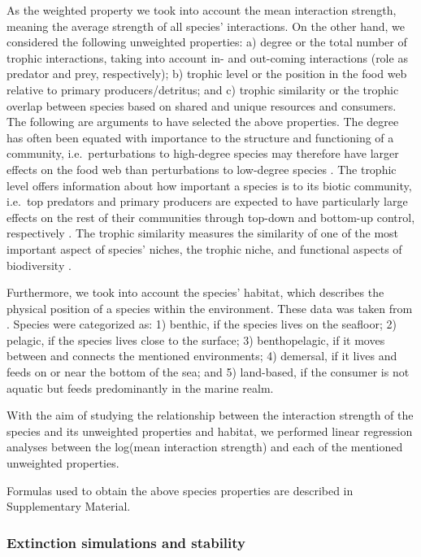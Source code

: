 \documentclass[gc, manuscript]{copernicus}
\begin{document}
As the weighted property we took into account the mean interaction
strength, meaning the average strength of all species' interactions. On
the other hand, we considered the following unweighted properties: a)
degree or the total number of trophic interactions, taking into account
in- and out-coming interactions (role as predator and prey,
respectively); b) trophic level or the position in the food web relative
to primary producers/detritus; and c) trophic similarity or the trophic
overlap between species based on shared and unique resources and
consumers. The following are arguments to have selected the above
properties. The degree has often been equated with importance to the
structure and functioning of a community, i.e.~perturbations to
high-degree species may therefore have larger effects on the food web
than perturbations to low-degree species
\citetext{\citealp{Dunne2002a}; \citealp[references
in][]{Cirtwill2018a}}. The trophic level offers information about how
important a species is to its biotic community, i.e.~top predators and
primary producers are expected to have particularly large effects on the
rest of their communities through top-down and bottom-up control,
respectively \citep[references in][]{Cirtwill2018a}. The trophic
similarity measures the similarity of one of the most important aspect
of species' niches, the trophic niche, and functional aspects of
biodiversity \citep{Martinez1991, Williams2000}.

Furthermore, we took into account the species' habitat, which describes
the physical position of a species within the environment. These data
was taken from \citet{Jacob2011}. Species were categorized as: 1)
benthic, if the species lives on the seafloor; 2) pelagic, if the
species lives close to the surface; 3) benthopelagic, if it moves
between and connects the mentioned environments; 4) demersal, if it
lives and feeds on or near the bottom of the sea; and 5) land-based, if
the consumer is not aquatic but feeds predominantly in the marine realm.

With the aim of studying the relationship between the interaction
strength of the species and its unweighted properties and habitat, we
performed linear regression analyses between the log(mean interaction
strength) and each of the mentioned unweighted properties.

Formulas used to obtain the above species properties are described in
Supplementary Material.

\subsubsection{Extinction simulations and stability}
\end{document}

